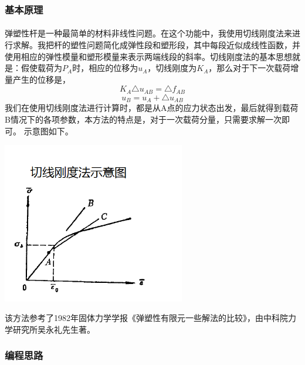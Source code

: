 \documentclass[UTF8]{ctexbook}
\begin{document}
\subsubsection{基本原理}
\paragraph{}
弹塑性杆是一种最简单的材料非线性问题。在这个功能中，我使用切线刚度法来进行求解。我把杆的塑性问题简化成弹性段和塑形段，其中每段近似成线性函数，并使用相应的弹性模量和塑形模量来表示两端线段的斜率。切线刚度法的基本思想就是：假使载荷为$P_A$时，相应的位移为$u_A$，切线刚度为$K_A$，那么对于下一次载荷增量产生的位移是，
$$K_A\triangle u_{AB}=\triangle f_{AB}$$
$$u_B=u_A+\triangle u_{AB}$$
我们在使用切线刚度法进行计算时，都是从A点的应力状态出发，最后就得到载荷B情况下的各项参数，本方法的特点是，对于一次载荷分量，只需要求解一次即可。
示意图如下。
\begin{center}
\includegraphics[width=0.6\textwidth]{plastic7.png}
\end{center}
该方法参考了1982年固体力学学报《弹塑性有限元一些解法的比较》，由中科院力学研究所吴永礼先生著。
\subsubsection{编程思路}
\end{document}
